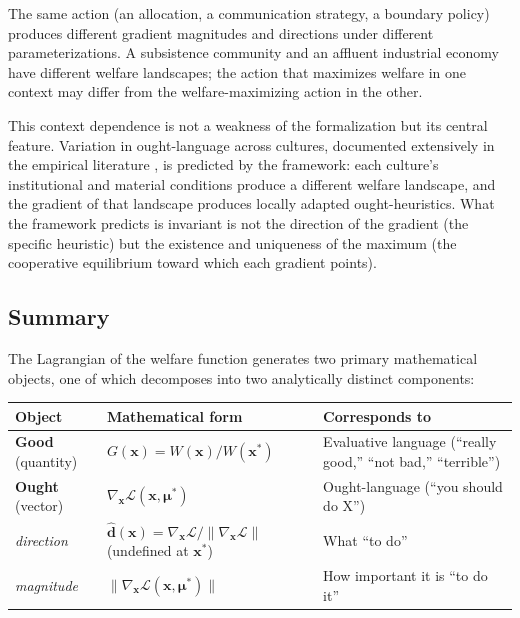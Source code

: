 \documentclass[11pt]{article}
\theoremstyle{plain}
\theoremstyle{definition}
\theoremstyle{remark}
\newcounter{none}
\let\origsubsection\subsection
\renewcommand{\subsection}{\needspace{7\baselineskip}\origsubsection}
\begin{document}
The same action (an allocation, a communication strategy, a boundary
policy) produces different gradient magnitudes and directions under
different parameterizations. A subsistence community and an affluent
industrial economy have different welfare landscapes; the action that
maximizes welfare in one context may differ from the welfare-maximizing
action in the other.

This context dependence is not a weakness of the formalization but its
central feature. Variation in ought-language across cultures, documented
extensively in the empirical literature
\citep{Haidt2010, Haidt2003, Curry2019}, is predicted by the framework:
each culture's institutional and material conditions produce a different
welfare landscape, and the gradient of that landscape produces locally
adapted ought-heuristics. What the framework predicts is invariant is
not the direction of the gradient (the specific heuristic) but the
existence and uniqueness of the maximum (the cooperative equilibrium
toward which each gradient points).

\subsection{Summary}\label{summary-1}

The Lagrangian of the welfare function generates two primary
mathematical objects, one of which decomposes into two analytically
distinct components:

{\def\LTcaptype{none} %
\begin{longtable}[]{@{}
  >{\raggedright\arraybackslash}p{}
  >{\raggedright\arraybackslash}p{}
  >{\raggedright\arraybackslash}p{}@{}}
\toprule\noalign{}
\begin{minipage}[b]{\linewidth}\raggedright
Object
\end{minipage} & \begin{minipage}[b]{\linewidth}\raggedright
Mathematical form
\end{minipage} & \begin{minipage}[b]{\linewidth}\raggedright
Corresponds to
\end{minipage} \\
\midrule\noalign{}
\endhead
\bottomrule\noalign{}
\endlastfoot
\textbf{Good} (quantity) &
\(G(\mathbf{x}) = W(\mathbf{x}) / W(\mathbf{x}^*)\) & Evaluative
language (``really good,'' ``not bad,'' ``terrible'') \\
\textbf{Ought} (vector) &
\(\nabla_{\mathbf{x}} \mathcal{L}(\mathbf{x}, \boldsymbol{\mu}^*)\) &
Ought-language (``you should do X'') \\
\hspace{1.5em}\emph{direction} &
\(\hat{\mathbf{d}}(\mathbf{x}) = \nabla_{\mathbf{x}} \mathcal{L} / \|\nabla_{\mathbf{x}} \mathcal{L}\|\)
(undefined at \(\mathbf{x}^*\)) & What ``to do'' \\
\hspace{1.5em}\emph{magnitude} &
\(\|\nabla_{\mathbf{x}} \mathcal{L}(\mathbf{x}, \boldsymbol{\mu}^*)\|\)
& How important it is ``to do it'' \\
\end{longtable}
}
\end{document}
